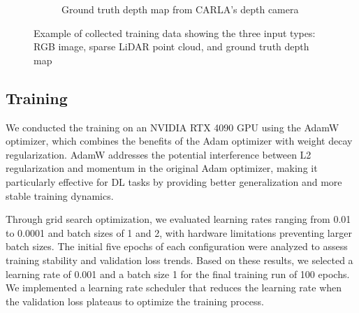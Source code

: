 \begin{figure}[h]
\begin{subfigure}{\textwidth}
        \caption{Ground truth depth map from CARLA's depth camera}
        \label{fig:depth_gt}
    \end{subfigure}
    \caption{Example of collected training data showing the three input types: RGB image, sparse \ac{LiDAR} point cloud, and ground truth depth map}
    \label{fig:data_collection}
\end{figure}
\FloatBarrier

\subsection{Training}

We conducted the training on an NVIDIA RTX 4090 GPU using the AdamW optimizer, which combines the benefits of the Adam optimizer with weight decay regularization. AdamW addresses the potential interference between L2 regularization and momentum in the original Adam optimizer, making it particularly effective for \ac{DL} tasks by providing better generalization and more stable training dynamics.

Through grid search optimization, we evaluated learning rates ranging from 0.01 to 0.0001 and batch sizes of 1 and 2, with hardware limitations preventing larger batch sizes. The initial five epochs of each configuration were analyzed to assess training stability and validation loss trends. Based on these results, we selected a learning rate of 0.001 and a batch size 1 for the final training run of 100 epochs. We implemented a learning rate scheduler that reduces the learning rate when the validation loss plateaus to optimize the training process.

